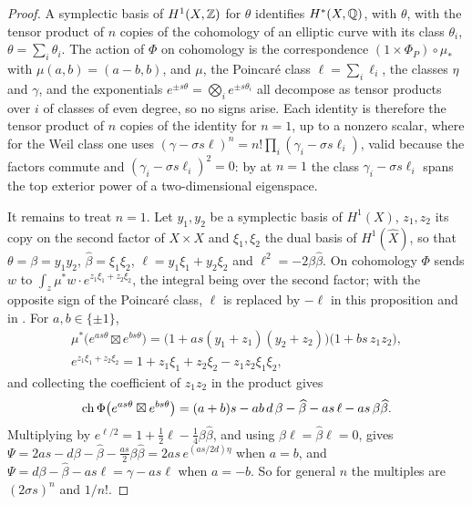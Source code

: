 \begin{proof}
A symplectic basis of $H^{1}(X,\mathbb{Z})$ for $\theta$ identifies $H^{*}(X,\mathbb{Q})$,
with $\theta$, with the tensor product of $n$ copies of the cohomology of an
elliptic curve with its class $\theta_{i}$, $\theta=\sum_{i}\theta_{i}$. The
action of $\Phi$ on cohomology is the correspondence $(1\times\Phi_{P})\circ
\mu_{*}$ with $\mu(a,b)=(a-b,b)$, and $\mu$, the Poincar\'e class
$\ell=\sum_{i}\ell_{i}$, the classes $\eta$ and $\gamma$, and the exponentials
$e^{\pm s\theta}=\bigotimes_{i}e^{\pm s\theta_{i}}$ all decompose as tensor
products over $i$ of classes of even degree, so no signs arise. Each identity
is therefore the tensor product of $n$ copies of the identity for $n=1$, up to
a nonzero scalar, where for the Weil class one uses
$(\gamma-\sigma s\ell)^{n}=n!\prod_{i}(\gamma_{i}-\sigma s\ell_{i})$, valid because
the factors commute and $(\gamma_{i}-\sigma s\ell_{i})^{2}=0$: by
\cite[Theorem~15.2(i)]{paperI} at $n=1$ the class $\gamma_{i}-\sigma s\ell_{i}$
spans the top exterior power of a two-dimensional eigenspace.

It remains to treat $n=1$. Let $y_{1},y_{2}$ be a symplectic basis of
$H^{1}(X)$, $z_{1},z_{2}$ its copy on the second factor of $X\times X$ and
$\xi_{1},\xi_{2}$ the dual basis of $H^{1}(\widehat X)$, so that
$\theta=\beta=y_{1}y_{2}$, $\widehat\beta=\xi_{1}\xi_{2}$,
$\ell=y_{1}\xi_{1}+y_{2}\xi_{2}$ and $\ell^{2}=-2\beta\widehat\beta$. On
cohomology $\Phi$ sends $w$ to $\int_{z}\mu^{*}w\cdot e^{z_{1}\xi_{1}+z_{2}\xi_{2}}$,
the integral being over the second factor; with the opposite sign of the
Poincar\'e class, $\ell$ is replaced by $-\ell$ in this proposition and in
. For $a,b\in\{\pm1\}$,
\begin{gather*}
  \mu^{*}\bigl(e^{as\theta}\boxtimes e^{bs\theta}\bigr)
  =\bigl(1+as(y_{1}+z_{1})(y_{2}+z_{2})\bigr)\bigl(1+bs\,z_{1}z_{2}\bigr),\\
  e^{z_{1}\xi_{1}+z_{2}\xi_{2}}=1+z_{1}\xi_{1}+z_{2}\xi_{2}-z_{1}z_{2}\xi_{1}\xi_{2},
\end{gather*}
and collecting the coefficient of $z_{1}z_{2}$ in the product gives
\[
  \operatorname{ch}\Phi\bigl(e^{as\theta}\boxtimes e^{bs\theta}\bigr)
  =(a+b)s-ab\,d\,\beta-\widehat\beta-as\,\ell-as\,\beta\widehat\beta .
\]
Multiplying by $e^{\ell/2}=1+\frac12\ell-\frac14\beta\widehat\beta$, and using
$\beta\ell=\widehat\beta\ell=0$, gives
$\Psi=2as-d\beta-\widehat\beta-\frac{as}{2}\beta\widehat\beta=2as\,e^{(as/2d)\eta}$
when $a=b$, and $\Psi=d\beta-\widehat\beta-as\ell=\gamma-as\ell$ when $a=-b$.
So for general $n$ the multiples are $(2\sigma s)^{n}$ and $1/n!$.


\end{proof}
